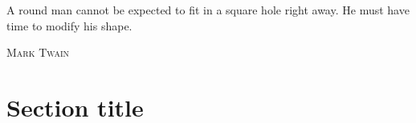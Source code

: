 \epigraph{A round man cannot be expected to fit in a square hole right away. He must have time to modify his shape.}%
{\textsc{Mark Twain}}
\null\vfill
\newpage
\blankpagewithnumber
\section{Section title}
\lipsum[1]
\newpage
\blankpagewithnumber